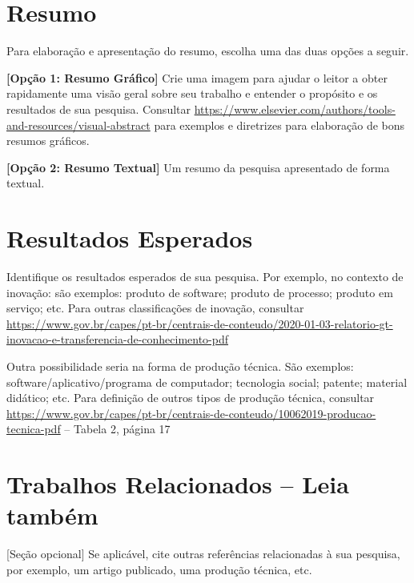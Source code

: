 \documentclass{ForPPGCPR-resumo}
\begin{document}
\section*{Resumo}

\textcolor{colorForPPGCPR}{Para elaboração e apresentação do resumo, escolha uma das duas opções a seguir.}

\textcolor{colorForPPGCPR}{
\textbf{[Opção 1: Resumo Gráfico]} Crie uma imagem para ajudar o leitor a obter rapidamente uma visão geral sobre seu trabalho e entender o propósito e os resultados de sua pesquisa. Consultar \url{https://www.elsevier.com/authors/tools-and-resources/visual-abstract} para exemplos e diretrizes para elaboração de bons resumos gráficos.
}

\textcolor{colorForPPGCPR}{\textbf{[Opção 2: Resumo Textual]} Um resumo da pesquisa apresentado de forma textual. }

\section*{Resultados Esperados}
\textcolor{colorForPPGCPR}{Identifique os resultados esperados de sua pesquisa. Por exemplo, no contexto de inovação: são exemplos: produto de software; produto de processo; produto em serviço; etc. Para outras classificações de inovação, consultar \url{https://www.gov.br/capes/pt-br/centrais-de-conteudo/2020-01-03-relatorio-gt-inovacao-e-transferencia-de-conhecimento-pdf}}

\textcolor{colorForPPGCPR}{Outra possibilidade seria na forma de produção técnica. São exemplos: software/aplicativo/programa de computador; tecnologia social; patente; material didático; etc. Para definição de outros tipos de produção técnica, consultar \url{https://www.gov.br/capes/pt-br/centrais-de-conteudo/10062019-producao-tecnica-pdf} – Tabela 2, página 17}



\section*{Trabalhos Relacionados -- Leia também}

\textcolor{colorForPPGCPR}{[Seção opcional] Se aplicável, cite outras referências relacionadas à sua pesquisa, por exemplo, um artigo publicado, uma produção técnica, etc.}
\end{document}
